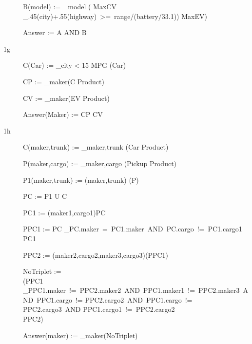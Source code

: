 \documentclass[12pt]{article}
\begin{document}
\begin{description}
B(model) := \pi_{model} ( MaxCV \bowtie_{.45(city)+.55(highway)\ >=\ range/(battery/33.1))} MaxEV)

Answer := A AND B






\clearpage
\item[1g ] $ $ \\
C(Car) :=  \sigma _{city < 15 MPG} (Car)

CP     :=              \pi_{maker}(C \bowtie Product)

CV     :=               \pi_{maker}(EV \bowtie Product)

Answer(Maker) := CP \bowtie CV


\clearpage
\item[1h ] $ $ \\

C(maker,trunk) := \pi_{maker,trunk} (Car \bowtie Product)

P(maker,cargo) := \pi_{maker,cargo} (Pickup \bowtie Product)

P1(maker,trunk) := \rho(maker,trunk) (P)

PC := P1 U C

PC1 := \rho(maker1,cargo1)PC

PPC1 := PC \bowtie_{PC.maker\ =\ PC1.maker\ AND\ PC.cargo\ !=\ PC1.cargo1} PC1

PPC2 := \rho(maker2,cargo2,maker3,cargo3)(PPC1)

NoTriplet :=\\ 
(PPC1\\ 
\bowtie_{PPC1.maker\ !=\ PPC2.maker2\ AND\ PPC1.maker1\ !=\ PPC2.maker3\ AND\ PPC1.cargo\ != PPC2.cargo2\ AND\ PPC1.cargo\ != PPC2.cargo3\ AND PPC1.cargo1\ !=\ PPC2.cargo2}\\
PPC2)

Answer(maker) := \Pi_{maker}(NoTriplet)









\clearpage
\end{description}
\end{document}
